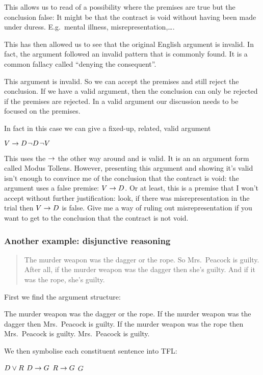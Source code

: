 This allows us to read of a possibility where the premises are true but the conclusion false:  It might be that the contract is void without having been made under duress. E.g.~mental illness, misrepresentation,\ldots.

This has then allowed us to see that the original English argument is invalid. In fact, the argument followed an invalid pattern that is commonly found. It is a common fallacy called ``denying the consequent''.

This argument is invalid. So we can accept the premises and still reject the conclusion. If we have a valid argument, then the conclusion can only be rejected if the premises are rejected. In a valid argument our discussion needs to be focused on the premises.

 In fact in this case we can give a fixed-up, related, valid argument \begin{earg}\prem $V\rightarrow D$\prem $\neg D$\conc$\neg V$\end{earg} This uses the $\rightarrow$ the other way around and is valid. It is an an argument form called Modus Tollens. However, presenting this argument and showing it's valid isn't enough to convince me of the conclusion that the contract is void: the argument uses a false premise: $V\rightarrow D$. Or at least, this is a premise that I won't accept without further justification: look, if there was misrepresentation in the trial then $V\rightarrow D$ is false. Give me a way of ruling out misrepresentation if you want to get to the conclusion that the contract is not void.


\subsubsection*{Another example: disjunctive reasoning}
\begin{quote}
The murder weapon was the dagger or the rope. So Mrs.~Peacock is guilty. After all, if the murder weapon was the dagger then she's guilty. And if it was the rope, she's guilty.
\end{quote}

First we find the argument structure:
\begin{earg}
\prem The murder weapon was the dagger or the rope.
\prem If the murder weapon was the dagger then Mrs.~Peacock  is guilty.
\prem If the murder weapon was the rope then Mrs.~Peacock  is guilty.
\conc Mrs.~Peacock is guilty.
\end{earg}
We then symbolise each constituent sentence into TFL:
\begin{earg}
\prem $D\vee R$
\prem $D\rightarrow G$
\prem$R\rightarrow G$
\conc $G$
\end{earg}

